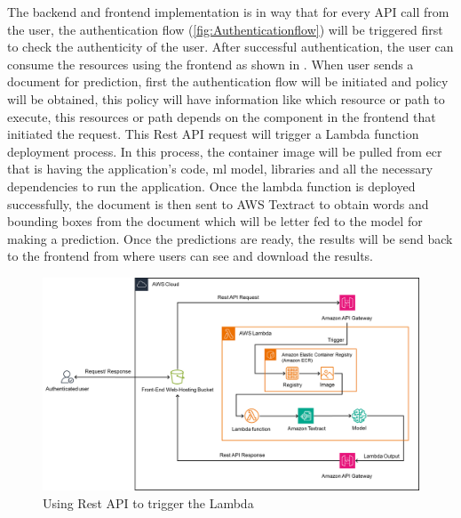 The backend and frontend implementation is in way that for every API call from the user, the authentication flow (\ref{fig:Authenticationflow}) will be triggered first to check the authenticity of the user. After successful authentication, the user can consume the resources using the frontend as shown in . When user sends a document for prediction, first the authentication flow will be initiated and policy will be obtained, this policy will have information like which resource or path to execute, this resources or path depends on the component in the frontend that initiated the request. This Rest API request will trigger a Lambda function deployment process. In this process, the container image will be pulled from \acrshort{ecr} that is having the application's code, \acrshort{ml} model, libraries and all the necessary dependencies to run the application. Once the lambda function is deployed successfully, the document is then sent to AWS Textract to obtain words and bounding boxes from the document which will be letter fed to the model for making a prediction. Once the predictions are ready, the results will be send back to the frontend from where users can see and download the results. 


\begin{figure}[!ht]
    \centering
    \includegraphics[width=0.95 \textwidth]{chapters/images/Methods/Deployment/Restapi_trigger.png}
    \caption{Using Rest API to trigger the Lambda}
    \label{fig:API_workflow}
\end{figure}

